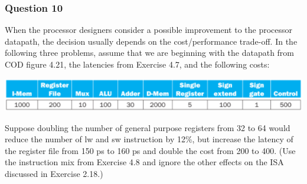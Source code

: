\documentclass[11pt]{article}
\begin{document}
\setcounter{subsubsection}{9}
\subsubsection{Question 10}
When the processor designers consider a possible improvement to the processor datapath, the decision usually depends on the cost/performance trade-off. In the following three problems, assume that we are beginning with the datapath from COD figure 4.21, the latencies from Exercise 4.7, and the following costs:
\begin{center}\includegraphics[scale=0.6]{q10_image}\\\end{center}
Suppose doubling the number of general purpose registers from 32 to 64 would reduce the number of lw and sw instruction by 12\%, but increase the latency of the register file from 150 ps to 160 ps and double the cost from 200 to 400. (Use the instruction mix from Exercise 4.8 and ignore the other effects on the ISA discussed in Exercise 2.18.)
\end{document}
